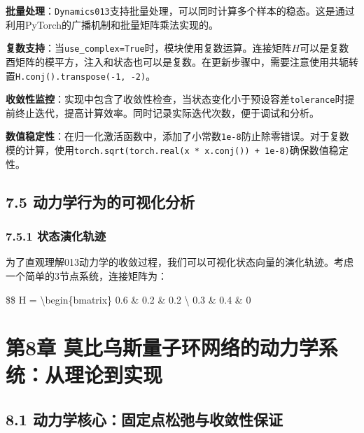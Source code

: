 \documentclass[
  12pt,
]{article}
\begin{document}
\textbf{批量处理}：\texttt{Dynamics013}支持批量处理，可以同时计算多个样本的稳态。这是通过利用PyTorch的广播机制和批量矩阵乘法实现的。

\textbf{复数支持}：当\texttt{use\_complex=True}时，模块使用复数运算。连接矩阵\(H\)可以是复数酉矩阵的模平方，注入和状态也可以是复数。在更新步骤中，需要注意使用共轭转置\texttt{H.conj().transpose(-1,\ -2)}。

\textbf{收敛性监控}：实现中包含了收敛性检查，当状态变化小于预设容差\texttt{tolerance}时提前终止迭代，提高计算效率。同时记录实际迭代次数，便于调试和分析。

\textbf{数值稳定性}：在归一化激活函数中，添加了小常数\texttt{1e-8}防止除零错误。对于复数模的计算，使用\texttt{torch.sqrt(torch.real(x\ *\ x.conj())\ +\ 1e-8)}确保数值稳定性。

\hypertarget{ux52a8ux529bux5b66ux884cux4e3aux7684ux53efux89c6ux5316ux5206ux6790}{%
\subsection{7.5
动力学行为的可视化分析}\label{ux52a8ux529bux5b66ux884cux4e3aux7684ux53efux89c6ux5316ux5206ux6790}}

\hypertarget{ux72b6ux6001ux6f14ux5316ux8f68ux8ff9}{%
\subsubsection{7.5.1
状态演化轨迹}\label{ux72b6ux6001ux6f14ux5316ux8f68ux8ff9}}

为了直观理解013动力学的收敛过程，我们可以可视化状态向量的演化轨迹。考虑一个简单的3节点系统，连接矩阵为：

\$\$ H = \textbackslash begin\{bmatrix\} 0.6 \& 0.2 \& 0.2
\textbackslash{} 0.3 \& 0.4 \& 0

\hypertarget{ux7b2c8ux7ae0-ux83abux6bd4ux4e4cux65afux91cfux5b50ux73afux7f51ux7edcux7684ux52a8ux529bux5b66ux7cfbux7edfux4eceux7406ux8bbaux5230ux5b9eux73b0}{%
\section{第8章
莫比乌斯量子环网络的动力学系统：从理论到实现}\label{ux7b2c8ux7ae0-ux83abux6bd4ux4e4cux65afux91cfux5b50ux73afux7f51ux7edcux7684ux52a8ux529bux5b66ux7cfbux7edfux4eceux7406ux8bbaux5230ux5b9eux73b0}}

\hypertarget{ux52a8ux529bux5b66ux6838ux5fc3ux56faux5b9aux70b9ux677eux5f1bux4e0eux6536ux655bux6027ux4fddux8bc1}{%
\subsection{8.1
动力学核心：固定点松弛与收敛性保证}\label{ux52a8ux529bux5b66ux6838ux5fc3ux56faux5b9aux70b9ux677eux5f1bux4e0eux6536ux655bux6027ux4fddux8bc1}}
\end{document}
